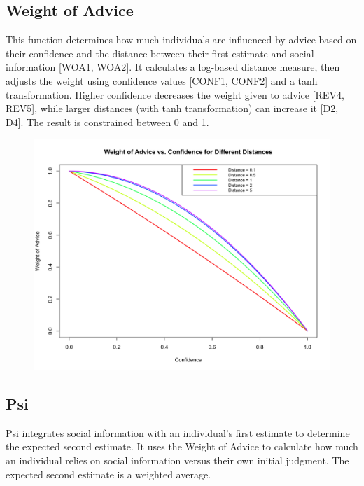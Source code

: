 \documentclass[
  man,floatsintext]{apa6}
\begin{document}
\hypertarget{weight-of-advice}{%
\subsection{Weight of Advice}\label{weight-of-advice}}

This function determines how much individuals are influenced by advice based on their confidence and the distance between their first estimate and social information {[}WOA1, WOA2{]}. It calculates a log-based distance measure, then adjusts the weight using confidence values {[}CONF1, CONF2{]} and a tanh transformation. Higher confidence decreases the weight given to advice {[}REV4, REV5{]}, while larger distances (with tanh transformation) can increase it {[}D2, D4{]}. The result is constrained between 0 and 1.

\begin{figure}[H]
\includegraphics[width=5.36in]{photos/woa} \caption{ }\label{fig:unnamed-chunk-3}
\end{figure}

\hypertarget{psi}{%
\subsection{Psi}\label{psi}}

Psi integrates social information with an individual's first estimate to determine the expected second estimate. It uses the Weight of Advice to calculate how much an individual relies on social information versus their own initial judgment. The expected second estimate is a weighted average.
\end{document}
